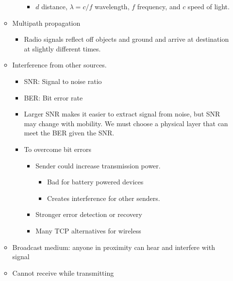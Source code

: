 \documentclass[]{article}
\providecommand{\tightlist}{%
  \setlength{\itemsep}{0pt}\setlength{\parskip}{0pt}}
\begin{document}
\begin{itemize}
\begin{itemize}
\begin{itemize}
      \begin{itemize}
      \tightlist
      \item
        \(d\) distance, \(\lambda = c/f\) wavelength, \(f\) frequency,
        and \(c\) speed of light.
      \end{itemize}
    \end{itemize}
  \item
    Multipath propagation

    \begin{itemize}
    \tightlist
    \item
      Radio signals reflect off objects and ground and arrive at
      destination at slightly different times.
    \end{itemize}
  \item
    Interference from other sources.

    \begin{itemize}
    \tightlist
    \item
      SNR: Signal to noise ratio
    \item
      BER: Bit error rate
    \item
      Larger SNR makes it easier to extract signal from noise, but SNR
      may change with mobility. We must choose a physical layer that can
      meet the BER given the SNR.
    \item
      To overcome bit errors

      \begin{itemize}
      \tightlist
      \item
        Sender could increase transmission power.

        \begin{itemize}
        \tightlist
        \item
          Bad for battery powered devices
        \item
          Creates interference for other senders.\\
        \end{itemize}
      \item
        Stronger error detection or recovery
      \item
        Many TCP alternatives for wireless
      \end{itemize}
    \end{itemize}
  \item
    Broadcast medium: anyone in proximity can hear and interfere with
    signal
  \item
    Cannot receive while transmitting


\end{itemize}
\end{itemize}
\end{document}

